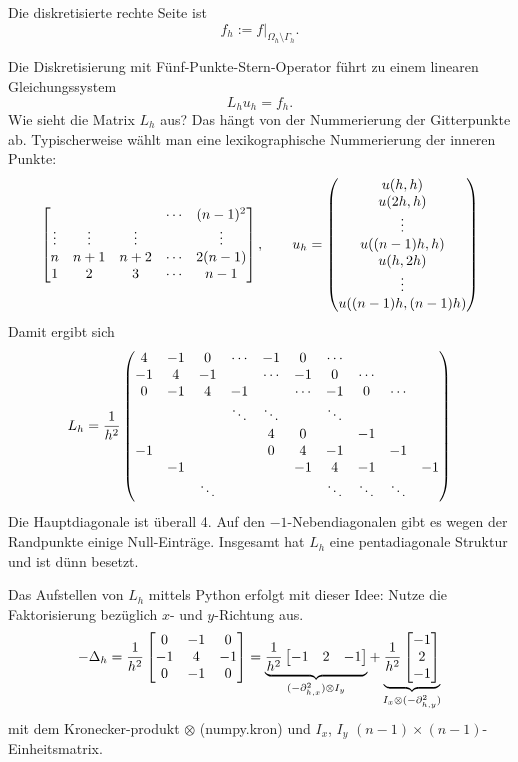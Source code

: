 Die diskretisierte rechte Seite ist
\[ f_h := f|_{\Omega_h \setminus \Gamma_h}. \]

Die Diskretisierung mit Fünf-Punkte-Stern-Operator führt zu einem linearen
Gleichungssystem
\[ L_h u_h = f_h. \]
Wie sieht die Matrix $L_h$ aus? Das hängt von der Nummerierung der Gitterpunkte
ab. Typischerweise wählt man eine lexikographische Nummerierung der inneren
Punkte:
\[ \begin{bmatrix}
    & & & \cdots & (n-1)^2 \\
    \vdots & \vdots & \vdots &  & \vdots \\
    n & n+1 & n+2 & \cdots & 2(n-1) \\
    1 & 2 & 3 & \cdots & n-1
  \end{bmatrix}, \qquad
  u_h = \begin{pmatrix}
    u(h,h) \\ u(2h,h) \\ \vdots \\
    u((n-1)h,h) \\ u(h,2h) \\ \vdots \\
    u( (n-1)h, (n-1)h) \end{pmatrix}
\]
Damit ergibt sich
\[ L_h = \frac{1}{h^2}
  \begin{pmatrix}
    4 & -1 & 0 & \cdots & -1 & 0 & \cdots \\
    -1 & 4 & -1 & & \cdots & -1 & 0 & \cdots \\
    0 & -1 & 4 & -1 & & \cdots & -1 & 0 & \cdots \\
    & & & \ddots & \ddots & & \ddots \\
    & & & & 4 & 0 & & -1 \\
    -1 & & & & 0 & 4 & -1 & & -1 \\
    & -1 & & & & -1 & 4 & -1 & & -1 \\
    & & \ddots & & & & \ddots & \ddots & \ddots \\
  \end{pmatrix}
\]
Die Hauptdiagonale ist überall 4. Auf den $-1$-Nebendiagonalen gibt es wegen der
Randpunkte einige Null-Einträge. Insgesamt hat $L_h$ eine pentadiagonale
Struktur und ist dünn besetzt.

Das Aufstellen von $L_h$ mittels Python erfolgt mit dieser Idee: Nutze die
Faktorisierung bezüglich $x$- und $y$-Richtung aus.
\[ -\Delta_h = \frac{1}{h^2}
  \begin{bmatrix}
    0 & -1 & 0 \\
    -1 & 4 & -1 \\
    0 & -1 & 0
  \end{bmatrix}
  = \underbrace{
    \frac{1}{h^2}
    \begin{bmatrix}
      -1 & 2 & -1
    \end{bmatrix}}_{(-\partial_{h,x}^2) \otimes I_y} +
  \underbrace{
    \frac{1}{h^2}
    \begin{bmatrix}
      -1 \\ 2 \\ -1
    \end{bmatrix}}_{I_x \otimes (-\partial_{h,y}^2)}
\]
mit dem Kronecker-produkt $\otimes$ (numpy.kron) und $I_x$, $I_y$ $(n-1) \times
(n-1)$-Einheitsmatrix.

